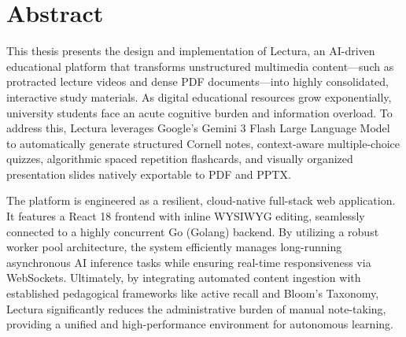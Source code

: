 \chapter*{Abstract}
\begin{SingleSpace}
This thesis presents the design and implementation of Lectura, an AI-driven educational platform that transforms unstructured multimedia content—such as protracted lecture videos and dense PDF documents—into highly consolidated, interactive study materials. As digital educational resources grow exponentially, university students face an acute cognitive burden and information overload. To address this, Lectura leverages Google's Gemini 3 Flash Large Language Model to automatically generate structured Cornell notes, context-aware multiple-choice quizzes, algorithmic spaced repetition flashcards, and visually organized presentation slides natively exportable to PDF and PPTX.

The platform is engineered as a resilient, cloud-native full-stack web application. It features a React 18 frontend with inline WYSIWYG editing, seamlessly connected to a highly concurrent Go (Golang) backend. By utilizing a robust worker pool architecture, the system efficiently manages long-running asynchronous AI inference tasks while ensuring real-time responsiveness via WebSockets. Ultimately, by integrating automated content ingestion with established pedagogical frameworks like active recall and Bloom's Taxonomy, Lectura significantly reduces the administrative burden of manual note-taking, providing a unified and high-performance environment for autonomous learning.
\end{SingleSpace}

